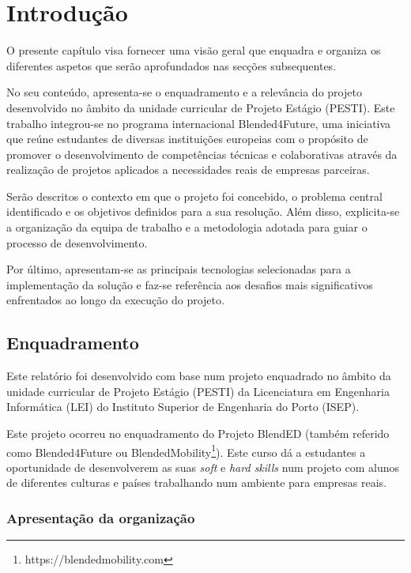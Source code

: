 \chapter{Introdução}
\label{chap:introducao}

O presente capítulo visa fornecer uma visão geral que enquadra e organiza os diferentes aspetos que serão aprofundados nas secções subsequentes.

No seu conteúdo, apresenta-se o enquadramento e a relevância do projeto desenvolvido no âmbito da unidade curricular de Projeto Estágio (PESTI). Este trabalho integrou-se no programa internacional Blended4Future, uma iniciativa que reúne estudantes de diversas instituições europeias com o propósito de promover o desenvolvimento de competências técnicas e colaborativas através da realização de projetos aplicados a necessidades reais de empresas parceiras.

Serão descritos o contexto em que o projeto foi concebido, o problema central identificado e os objetivos definidos para a sua resolução. Além disso, explicita-se a organização da equipa de trabalho e a metodologia adotada para guiar o processo de desenvolvimento.

Por último, apresentam-se as principais tecnologias selecionadas para a implementação da solução e faz-se referência aos desafios mais significativos enfrentados ao longo da execução do projeto.



\section{Enquadramento}
\label{sec:introducao_enquadramento}

Este relatório foi desenvolvido com base num projeto enquadrado no âmbito da unidade curricular de Projeto Estágio (PESTI) da Licenciatura em Engenharia Informática (LEI) do Instituto Superior de Engenharia do Porto (ISEP).

Este projeto ocorreu no enquadramento do Projeto BlendED (também referido como Blended4Future ou BlendedMobility\footnote{https://blendedmobility.com}). Este curso dá a estudantes a oportunidade de desenvolverem as suas \textit{soft} e \textit{hard skills} num projeto com alunos de diferentes culturas e países trabalhando num ambiente para empresas reais.

\subsection{Apresentação da organização}

